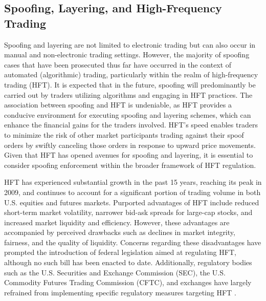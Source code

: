 \subsection{Spoofing, Layering, and High-Frequency Trading}

Spoofing and layering are not limited to electronic trading but can also occur in manual and non-electronic trading settings.
However, the majority of spoofing cases that have been prosecuted thus far have occurred in the context of automated (algorithmic)
trading, particularly within the realm of high-frequency trading (HFT). It is expected that in the future, spoofing will
predominantly be carried out by traders utilizing algorithms and engaging in HFT practices. The association between spoofing
and HFT is undeniable, as HFT provides a conducive environment for executing spoofing and layering schemes, which can enhance
the financial gains for the traders involved. HFT's speed enables traders to minimize the risk of other market participants
trading against their spoof orders by swiftly canceling those orders in response to upward price movements. Given that HFT
has opened avenues for spoofing and layering, it is essential to consider spoofing enforcement within the broader framework
of HFT regulation.

HFT has experienced substantial growth in the past 15 years, reaching its peak in 2009, and continues to account for a
significant portion of trading volume in both U.S. equities and futures markets. Purported advantages of HFT include reduced
short-term market volatility, narrower bid-ask spreads for large-cap stocks, and increased market liquidity and efficiency.
However, these advantages are accompanied by perceived drawbacks such as declines in market integrity, fairness, and the
quality of liquidity. Concerns regarding these disadvantages have prompted the introduction of federal legislation aimed
at regulating HFT, although no such bill has been enacted to date. Additionally, regulatory bodies such as the U.S.
Securities and Exchange Commission (SEC), the U.S. Commodity Futures Trading Commission (CFTC), and exchanges have largely
refrained from implementing specific regulatory measures targeting HFT \cite{chilton2012perspectives}.

